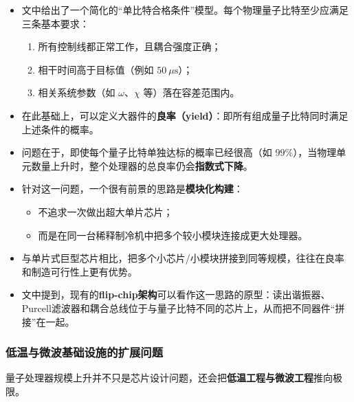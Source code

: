 \documentclass[12pt,a4paper,oneside]{ctexbook}
\begin{document}
\begin{itemize}
    \item 文中给出了一个简化的“单比特合格条件”模型。每个物理量子比特至少应满足三条基本要求：
    \begin{enumerate}
        \item 所有控制线都正常工作，且耦合强度正确；
        \item 相干时间高于目标值（例如 \(50~\mu\mathrm{s}\)）；
        \item 相关系统参数（如 \(\omega\)、\(\chi\) 等）落在容差范围内。
    \end{enumerate}
    
    \item 在此基础上，可以定义大器件的\textbf{良率（yield）}：即所有组成量子比特同时满足上述条件的概率。
    
    \item 问题在于，即使每个量子比特单独达标的概率已经很高（如 \(99\%\)），当物理单元数量上升时，整个处理器的总良率仍会\textbf{指数式下降}。
    
    \item 针对这一问题，一个很有前景的思路是\textbf{模块化构建}：
    \begin{itemize}
        \item 不追求一次做出超大单片芯片；
        \item 而是在同一台稀释制冷机中把多个较小模块连接成更大处理器。
    \end{itemize}
    
    \item 与单片式巨型芯片相比，把多个小芯片/小模块拼接到同等规模，往往在良率和制造可行性上更有优势。
    
    \item 文中提到，现有的\textbf{flip-chip架构}可以看作这一思路的原型：读出谐振器、Purcell滤波器和耦合总线位于与量子比特不同的芯片上，从而把不同器件“拼接”在一起。
\end{itemize}

\subsubsection{低温与微波基础设施的扩展问题}

量子处理器规模上升并不只是芯片设计问题，还会把\textbf{低温工程与微波工程}推向极限。
\end{document}
